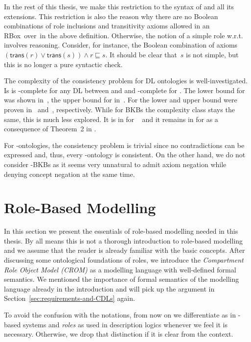 In the rest of this thesis, we make this restriction to the syntax of \SHQ and all its
extensions.
%
This restriction is also the reason why there are no Boolean combinations of
role inclusions and transitivity axioms allowed in an RBox~\Rmc over~\Nsig in
the above definition.  Otherwise, the notion of a simple role w.r.t.~\Rmc
involves reasoning.  Consider, for instance, the Boolean combination of axioms
$(\mathsf{trans}(r)\lor\mathsf{trans}(s))\land r\sqsubseteq s$.  It should be
clear that~$s$ is not simple, but this is no longer a pure syntactic check.

The complexity of the consistency problem for DL ontologies is well-investigated. Is is
\ExpTime-complete for any DL between \ALC and \SHOQ and \NExpTime-complete for \SHOIQ. The lower
bound for \ALC was shown in~\cite{Sch-IJCAI91}, the upper bound for \SHOQ in~\cite{Tob-PhD01}. For
\SHOIQ the lower and upper bound were proven in~\cite{Tob-JAIR00} and~\cite{Tob-PhD01},
respectively. While for BKBs the complexity class stays the same, this is much less explored. It is
in \ExpTime for \SHOQ~\cite{Lip-PhD14} and it remains in \NExpTime for \SHOIQ as a consequence of
Theorem~2 in \cite{Pra-JLLI05}.

For \EL-ontologies, the consistency problem is trivial since no contradictions can be expressed and,
thus, every \EL-ontology is consistent. On the other hand, we do not consider \EL-BKBs as it seems
very unnatural to admit axiom negation while denying concept negation at the same time.


\section{Role-Based Modelling}
\label{sec:role-based-modelling}

In this section we present the essentials of role-based modelling needed in this thesis. By all
means this is not a thorough introduction to role-based modelling and we assume that the reader is
already familiar with the basic concepts.
%
After discussing some ontological foundations of roles, we introduce the \emph{Compartment Role
  Object Model (CROM)} as a modelling language with well-defined formal semantics. We mentioned the
importance of formal semantics of the modelling language already in the introduction and will pick
up the argument in Section~\ref{sec:requirements-and-CDLs} again.

To avoid the confusion with the notations, from now on we differentiate \emph{\rosiroles} as
in \rosirole-based systems and \emph{roles} as used in description logics whenever we feel it is
necessary. Otherwise, we drop that distinction if it is clear from the context.
%
